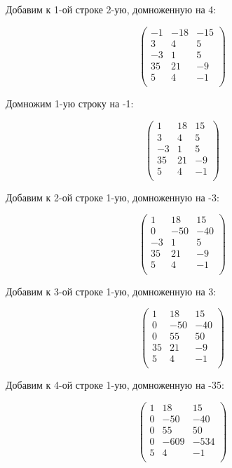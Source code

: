 	Добавим к 1-ой строке 2-ую, домноженную на 4:
	
	\[
	\begin{pmatrix}
	-1 & -18 & -15 \\
	3 & 4 & 5 \\
	-3 & 1 & 5 \\
	35 & 21 & -9 \\
	5 & 4 & -1 \\
	\end{pmatrix}
	\]
	
	Домножим 1-ую строку на -1:
	
	\[
	\begin{pmatrix}
	1 & 18 & 15 \\
	3 & 4 & 5 \\
	-3 & 1 & 5 \\
	35 & 21 & -9 \\
	5 & 4 & -1 \\
	\end{pmatrix}
	\]
	
	Добавим к 2-ой строке 1-ую, домноженную на -3:
	
	\[
	\begin{pmatrix}
	1 & 18 & 15 \\
	0 & -50 & -40 \\
	-3 & 1 & 5 \\
	35 & 21 & -9 \\
	5 & 4 & -1 \\
	\end{pmatrix}
	\]
	
	Добавим к 3-ой строке 1-ую, домноженную на 3:
	
	\[
	\begin{pmatrix}
	1 & 18 & 15 \\
	0 & -50 & -40 \\
	0 & 55 & 50 \\
	35 & 21 & -9 \\
	5 & 4 & -1 \\
	\end{pmatrix}
	\]
	
	Добавим к 4-ой строке 1-ую, домноженную на -35:
	
	\[
	\begin{pmatrix}
	1 & 18 & 15 \\
	0 & -50 & -40 \\
	0 & 55 & 50 \\
	0 & -609 & -534 \\
	5 & 4 & -1 \\
	\end{pmatrix}
	\]
	
